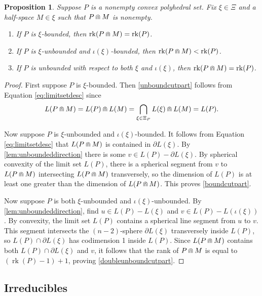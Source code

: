 \documentclass[11pt]{amsart}
\newtheorem{prop}[theorem]{Proposition}
\numberwithin{table}{section}
\numberwithin{figure}{section}
\theoremstyle{remark}
\DeclareMathOperator{\rk}{rk}
\begin{document}
\begin{prop} \label{prop:piececut} Suppose $P$ is a nonempty
  convex polyhedral set.  Fix $\xi\in \Xi$ and a half-space
  $M\in \xi$ such that $P\doublecap M$ is nonempty.
  \begin{enumerate}
  \item \label{unboundcutpart} If $P$ is $\xi$-bounded, then  
    $\rk(P\doublecap M) = \rk(P)$.
  \item \label{boundcutpart} If $P$ is $\xi$-unbounded and 
    $\iota(\xi)$-bounded, then  $\rk(P\doublecap M) < \rk(P)$.
  \item \label{doubleunboundcutpart} If $P$ is unbounded with respect
    to both $\xi$ and $\iota(\xi)$, then $\rk(P\doublecap M) = \rk(P)$.
  \end{enumerate}
\end{prop}
\begin{proof}
  First suppose $P$ is $\xi$-bounded. Then \cref{unboundcutpart}
  follows from Equation \eqref{eq:limitsetdesc} since  
  \[ L(P\doublecap M) = L(P)\doublecap L(M) = \bigcap_{\xi \in
      \Xi_P} L(\xi)  \doublecap L(M) = L(P).
  \]
  
  Now suppose $P$ is $\xi$-unbounded and $\iota(\xi)$-bounded.  It
  follows from Equation \eqref{eq:limitsetdesc} that
  $L(P\doublecap M)$ is contained in $\partial L(\xi)$. By
  \cref{lem:unboundeddirection} there is some
  $v\in L(P) - \partial L(\xi)$. By spherical convexity of the limit
  set $L(P)$, there is a spherical segment from $v$ to $L(P\doublecap M)$
  intersecting $L(P\doublecap M)$ transversely, so the dimension of $L(P)$
  is at least one greater than the dimension of $L(P\doublecap M)$. This
  proves \cref{boundcutpart}.
   
  Now suppose $P$ is both $\xi$-unbounded and
  $\iota(\xi)$-unbounded.  By \cref{lem:unboundeddirection}, find
  $u \in L(P)- L(\xi)$ and $v\in L(P)- L(\iota(\xi))$. By
  convexity, the limit set $L(P)$ contains a spherical line segment
  from $u$ to $v$. This segment intersects the $(n-2)$-sphere
  $\partial L(\xi)$ transversely inside $L(P)$, so
  $L(P) \cap \partial L(\xi)$ has codimension 1 inside
  $L(P)$. Since $L(P\doublecap M)$ contains both
  $L(P) \cap\partial L(\xi)$ and $v$, it follows that the rank of
  $P\doublecap M$ is equal to $(\rk(P)-1)+1$, proving
  \cref{doubleunboundcutpart}.
\end{proof}

\subsection{Irreducibles}
\end{document}
